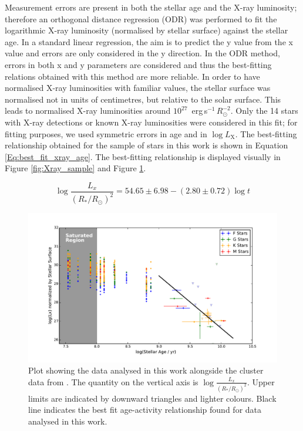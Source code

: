 Measurement errors are present in both the stellar age and the X-ray luminosity; therefore an orthogonal distance regression (ODR) \citep{Boggs_Rogers_1990} was performed to fit the logarithmic X-ray luminosity (normalised by stellar surface) against the stellar age. In a standard linear regression, the aim is to predict the y value from the x value and errors are only considered in the y direction. In the ODR method, errors in both x and y parameters are considered and thus the best-fitting relations obtained with this method are more reliable. In order to have normalised X-ray luminosities with familiar values, the stellar surface was normalised not in units of centimetres, but relative to the solar surface. This leads to normalised X-ray luminosities around $10^{27}$~erg\,s$^{-1}$\,$R_\odot^{-2}$. Only the 14 stars with X-ray detections or known X-ray luminosities were considered in this fit; for fitting purposes, we used symmetric errors in age and in $\log L_{\mathrm{X}}$. The best-fitting relationship obtained for the sample of stars in this work is shown in Equation \ref{Eq:best_fit_xray_age}. The best-fitting relationship is displayed visually in Figure \ref{fig:Xray_sample} and Figure \ref{fig:full_xray_plot_with_clusters}.

\begin{equation}
	\log\frac{L_{x}}{(R_\ast/R_\odot)^{2}} = 54.65 \pm 6.98 - (2.80 \pm 0.72)\log t
	\label{Eq:best_fit_xray_age}
\end{equation}

\begin{figure}[h]
    \centering
    \includegraphics[scale=0.55]{Figures/3-Xray_age/full_xray_results.pdf}
    \caption[Plot of X-ray sample with best-fitting relationship and cluster data for reference]{Plot showing the data analysed in this work alongside the cluster data from \citet{Jackson_etal_2012}. The quantity on the vertical axis is $\log\frac{L_{x}}{(R_\ast/R_\odot)^{2}}$. Upper limits are indicated by downward triangles and lighter colours.  Black line indicates the best fit age-activity relationship found for data analysed in this work.}
    \label{fig:full_xray_plot_with_clusters}
\end{figure}

